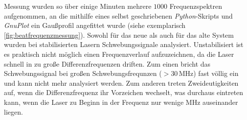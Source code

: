 Messung wurden so über einige Minuten mehrere $1000$ Frequenzspektren
aufgenommen, an die  mithilfe eines selbst geschriebenen \textit{Python}-Skripts
und \textit{GnuPlot} ein Gaußprofil angefittet wurde (siehe exemplarisch
\ref{fig:beatfrequenzmessung}).
Sowohl für das neue als auch für das alte System wurden bei stabilisierten
Lasern Schwebungssignale analysiert. Unstabilisiert ist es praktisch nicht
möglich einen Frequenzverlauf aufzuzeichnen, da die Laser schnell in zu
große Differenzfrequenzen driften. Zum einen bricht das Schwebungssignal
bei großen Schwebungsfrequnzen ($>30\,$MHz) fast völlig ein und kann nicht mehr
analysiert werden. Zum anderen treten Zweideutigkeiten auf, wenn die
Differenzfrequenz ihr Vorzeichen wechselt, was durchaus eintreten kann, wenn die
Laser zu Beginn in der Frequenz nur wenige MHz auseinander liegen.

